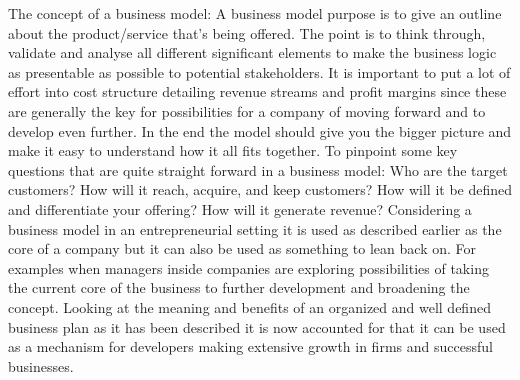 \documentclass[conference]{IEEEtran}
\begin{document}
The concept of a business model:
A business model purpose is to give an outline about the product/service that's being offered. The point is to think through, validate and analyse all different significant elements to make the business logic as presentable as possible to potential stakeholders. It is important to put a lot of effort into cost structure detailing revenue streams and profit margins since these are generally the key for possibilities for a company of moving forward and to develop even further\cite{wikibusiness}. In the end the model should give you the bigger picture and make it easy to understand how it all fits together\cite{BusinessFundamentals}. 
     To pinpoint some key questions that are quite straight forward in a business model\cite{ForDummies}:
Who are the target customers?
How will it reach, acquire, and keep customers?
How will it be defined and differentiate your offering?
How will it generate revenue?
    Considering a business model in an entrepreneurial setting it is used as described earlier as the core of a company but it can also be used as something to lean back on. For examples when managers inside companies are exploring possibilities of taking the current core of the business to further development and broadening the concept. Looking at the meaning and benefits of an organized and well defined business plan as it has been described it is now accounted for that it can be used as a mechanism for developers making extensive growth in firms and successful businesses.  
\end{document}
